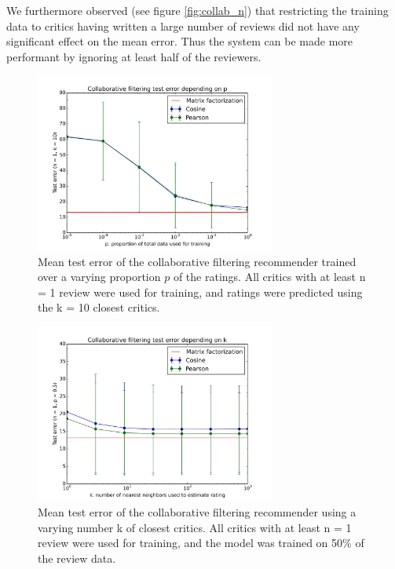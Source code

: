\documentclass[10.5pt]{article}
\begin{document}
We furthermore observed (see figure \ref{fig:collab_n}) that restricting the
training data to critics having
written a large number of reviews did not have any significant effect on the
mean error. Thus the system can be made more performant by ignoring at least
half of the reviewers.

\begin{figure}[H]
\centering
\includegraphics[width=0.7\textwidth]{../plots/collab/graph_p.png}
\caption{Mean test error of the collaborative filtering recommender trained
    over a varying proportion $p$ of the ratings. All critics with at least
    n = 1 review were used for training, and ratings were predicted using the
    k = 10 closest critics.}
\label{fig:collab_p}
\end{figure}

\begin{figure}[H]
\centering
\includegraphics[width=0.7\textwidth]{../plots/collab/graph_k.png}
\caption{Mean test error of the collaborative filtering recommender using a
    varying number k of closest critics. All critics with at least n = 1
    review were used for training, and the model was trained on 50\% of the
    review data.}
\label{fig:collab_k}
\end{figure}
\end{document}
